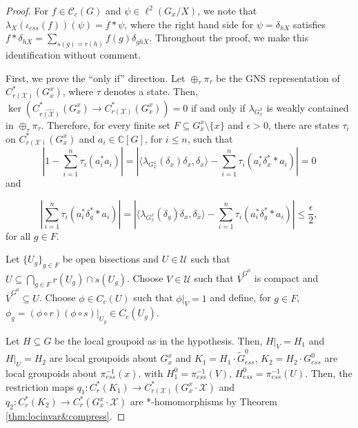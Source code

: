 \documentclass[a4paper, 12pt]{amsart}
\theoremstyle{definition}
\theoremstyle{remark}
\numberwithin{equation}{section}
\begin{document}
\begin{proof}
 For $f\in \mathscr{C}_{c}(G)$ and $\psi\in \ell^{2}(G_{x}/X)$, we note that $\lambda_{X}(\iota_{ess}(f))(\psi) = f*\psi$, where the right hand side for $\psi = \delta_{hX}$ satisfies $f*\delta_{hX} = \sum_{s(g) = r(h)}f(g)\delta_{ghX}$. Throughout the proof, we make this identification without comment.

    First, we prove the ``only if'' direction. Let $\oplus_{\tau}\pi_{\tau}$ be the GNS representation of $C^{*}_{r(\mathcal{X})}(G^{x}_{x})$, where $\tau$ denotes a state. Then, $\ker(C^{*}_{\widehat{r(\mathcal{X})}}(G^{x}_{x})\to C^{*}_{r(\mathcal{X})}(G^{x}_{x})) = 0$ if and only if $\lambda_{G^{x}_{x}}$ is weakly contained in $\oplus_{\tau}\pi_{\tau}$. Therefore, for every finite set $F\subseteq G^{x}_{x}\setminus \{x\}$ and $\epsilon > 0$, there are states $\tau_{i}$ on $C^{*}_{r(\mathcal{X})}(G^{x}_{x})$ and $a_{i}\in\mathbb{C}[G]$, for $i\leq n$, such that $$| 1 - \sum^{n}_{i=1}\tau_{i}(a^{*}_{i}a_{i})| = |\langle\lambda_{G^{x}_{x}}(\delta_{x})\delta_{x}, \delta_{x}\rangle - \sum^{n}_{i=1}\tau_{i}(a^{*}_{i} \delta^{*}_{x}*a_{i})| = 0$$ and

    \begin{equation}
    \label{eq:wkequivalence1}
        | \sum^{n}_{i = 1}\tau_{i}(a^{*}_{i}\delta^{*}_{g} * a_{i})| = |\langle \lambda_{G^{x}_{x}}(\delta_{g})\delta_{x},\delta_{x}\rangle - \sum^{n}_{i = 1}\tau_{i}(a^{*}_{i}\delta^{*}_{g}* a_{i})|\leq \frac{\epsilon}{2},
    \end{equation}
for all $g\in F$.

Let $\{U_{g}\}_{g\in F}$ be open bisections and $U\in\mathcal{U}$ such that $U\subseteq \bigcap_{g\in F} r(U_{g})\cap s(U_{g})$. Choose $V\in\mathcal{U}$ such that $\overline{V}^{G^{0}}$ is compact and $\overline{V}^{G^{0}}\subseteq U$. Choose $\phi\in C_{c}(U)$ such that $\phi|_{V} = 1$ and define, for $g\in F$, $\phi_{g} = (\phi\circ r)(\phi\circ s)|_{U_{g}}\in C_{c}(U_{g})$.

Let $H\subseteq G$ be the local groupoid as in the hypothesis. Then, $H|_{V} = H_{1}$ and $H|_{U} = H_{2}$ are local groupoids about $G^{x}_{x}$ and $K_{1} = H_{1}\cdot\tilde{G}_{ess}^{0}$, $K_{2} = H_{2}\cdot G^{0}_{ess}$ are local groupoids about $\pi_{ess}^{-1}(x)$. with $H^{0}_{1} = \pi_{ess}^{-1}(V)$, $H^{0}_{ess} = \pi^{-1}_{ess}(U)$. Then, the restriction maps $q_{1}:C^{*}_{r}(K_{1})\to C^{*}_{r(\mathcal{X})}(G^{x}_{x}\cdot \mathcal{X})$ and $q_{2}:C^{*}_{r}(K_{2})\to C^{*}_{r}(G^{x}_{x}\cdot\mathcal{X})$ are *-homomorphisms by Theorem \ref{thm:locinvar&compress}.


\end{proof}
\end{document}
